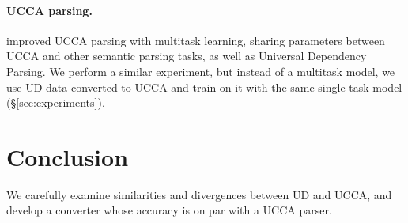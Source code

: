 \documentclass[11pt,a4paper]{article}
\begin{document}
\paragraph{UCCA parsing.}

 improved UCCA parsing with multitask learning, sharing parameters
between UCCA and other semantic parsing tasks, as well as Universal Dependency Parsing.
We perform a similar experiment, but instead of a multitask model,
we use UD data converted to UCCA and train on it with the same single-task model (\S\ref{sec:experiments}).


\section{Conclusion}\label{sec:conclusion}

We carefully examine similarities and divergences between UD and UCCA,
and develop a converter whose accuracy is on par with a UCCA parser.




\end{document}
